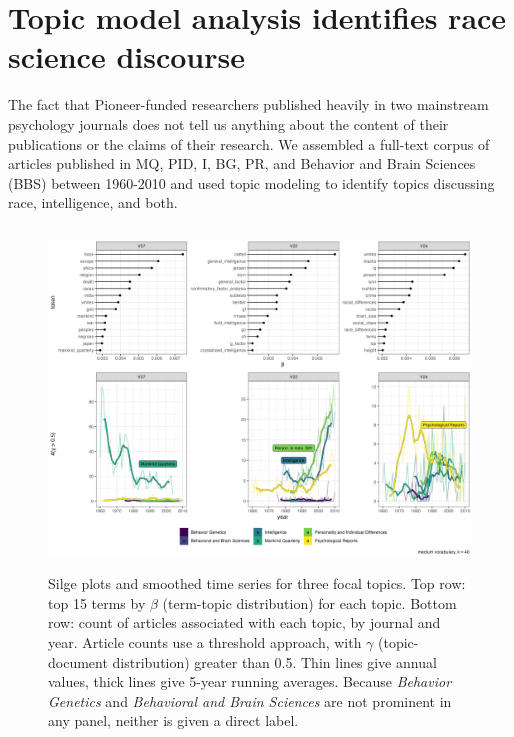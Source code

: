 \documentclass[12pt]{article}
\begin{document}
\hypertarget{topic-model-analysis-identifies-race-science-discourse}{%
\section*{Topic model analysis identifies race science discourse}\label{topic-model-analysis-identifies-race-science-discourse}}

The fact that Pioneer-funded researchers published heavily in two mainstream psychology journals does not tell us anything about the content of their publications or the claims of their research. We assembled a full-text corpus of articles published in MQ, PID, I, BG, PR, and Behavior and Brain Sciences (BBS) between 1960-2010 and used topic modeling to identify topics discussing race, intelligence, and both.

\begin{figure}
\centering
\includegraphics[width=4.76in,height=3.57in]{img/focal_topics.png}
\caption{Silge plots \cite{SilgeTopicModeling2017} and smoothed time series for three focal topics. Top row: top 15 terms by \(\beta\) (term-topic distribution) for each topic. Bottom row: count of articles associated with each topic, by journal and year. Article counts use a threshold approach, with \(\gamma\) (topic-document distribution) greater than 0.5. Thin lines give annual values, thick lines give 5-year running averages. Because \emph{Behavior Genetics} and \emph{Behavioral and Brain Sciences} are not prominent in any panel, neither is given a direct label. \label{fig:focal}}
\end{figure}
\end{document}
